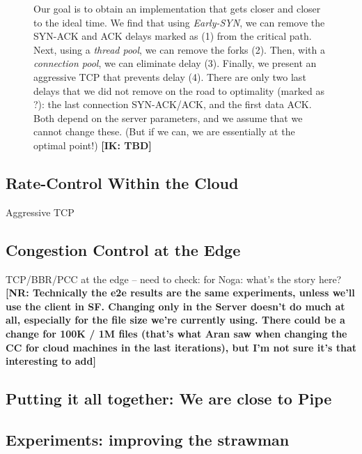 \documentclass[10pt,sigconf]{acmart}
\newcommand{\mycomm}[3]{{\color{#2} \textbf{[#1: #3]}}}
\newcommand{\mycomm}[3]{}
\newcommand{\IK}[1]{\mycomm{IK}{blue}{#1}}
\newcommand{\NR}[1]{\mycomm{NR}{violet}{#1}}
\begin{document}
\begin{figure}[t]
{    Our goal is to obtain an implementation that gets closer and closer to the ideal time. We find that using \textit{Early-SYN}, we can remove the SYN-ACK and ACK delays marked as (1) from the critical path. Next, using a \textit{thread pool}, we can remove the forks (2). Then, with a \textit{connection pool}, we can eliminate delay (3). Finally, we present an aggressive TCP that prevents delay (4). There are only two last delays that we did not remove on the road to optimality (marked as ?): the last connection SYN-ACK/ACK, and the first data ACK. Both depend on the server parameters, and we assume that we cannot change these. (But if we can, we are essentially at the optimal point!)      \IK{TBD} }
\end{figure}





\subsection{Rate-Control Within the Cloud}
Aggressive TCP

\subsection{Congestion Control at the Edge}

TCP/BBR/PCC at the edge -- need to check: for Noga: what's the story here? \NR{Technically the e2e results are the same experiments, unless we'll use the client in SF. Changing only in the Server doesn't do much at all, especially for the file size we're currently using. There could be a change for 100K / 1M files (that's what Aran saw when changing the CC for cloud machines in the last iterations), but I'm not sure it's that interesting to add}

\subsection{Putting it all together: We are close to Pipe}

\subsection{Experiments: improving the strawman}
\end{document}
